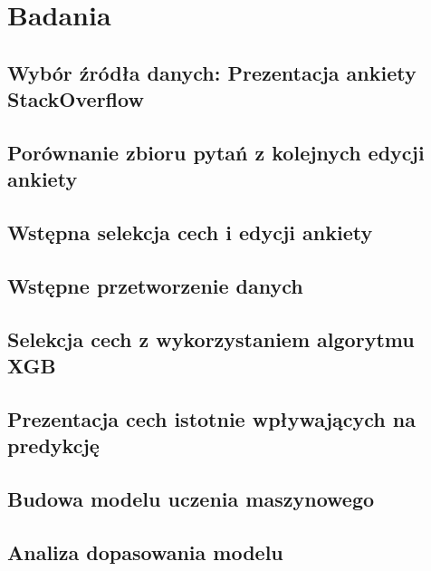 \chapter{Badania}\label{ch:analysis}
\section{Wybór źródła danych: Prezentacja ankiety StackOverflow}\label{sec:analysis:data-source-selection}
\todo{}
\section{Porównanie zbioru pytań z kolejnych edycji ankiety}\label{sec:analysis:questions-comparision}
\todo{}
\section{Wstępna selekcja cech i edycji ankiety}\label{sec:analysis:feature-pre-selection}
\section{Wstępne przetworzenie danych}\label{sec:analysis:preprocessing}
\section{Selekcja cech z wykorzystaniem algorytmu XGB}\label{sec:analysis:feature-selection-xgb}
\todo{}
\section{Prezentacja cech istotnie wpływających na predykcję}\label{sec:analysis:important-features}
\todo{}
\section{Budowa modelu uczenia maszynowego}\label{sec:analysis:ml-model}
\section{Analiza dopasowania modelu}\label{sec:analysis:model-fitness}

\thispagestyle{normal}

